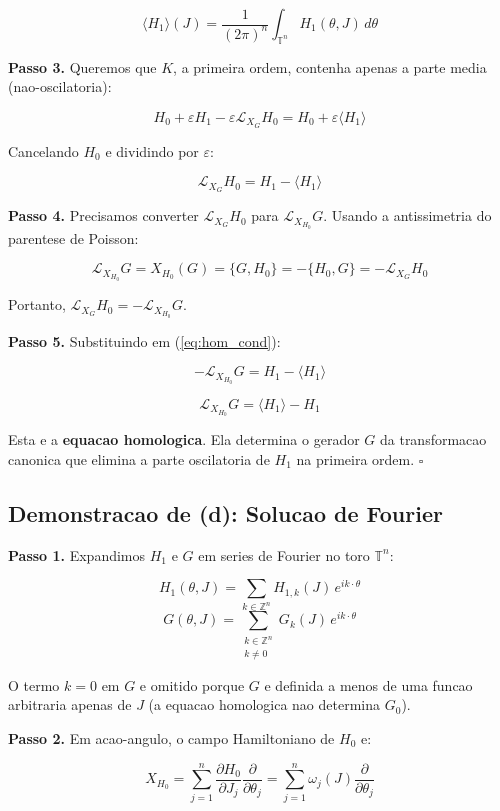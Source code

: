 \documentclass[12pt,a4paper,oneside]{article}
\begin{document}
$$\langle H_1\rangle(J) = \frac{1}{(2\pi)^n}
\int_{\mathbb{T}^n} H_1(\theta, J)\,d\theta$$

\textbf{Passo 3.} Queremos que $K$, a primeira ordem, contenha apenas a
parte media (nao-oscilatoria):

$$H_0 + \varepsilon H_1 - \varepsilon\mathcal{L}_{X_G}H_0 =
H_0 + \varepsilon\langle H_1\rangle$$

Cancelando $H_0$ e dividindo por $\varepsilon$:

\begin{equation}\label{eq:hom_cond}
\mathcal{L}_{X_G}H_0 = H_1 - \langle H_1\rangle
\end{equation}

\textbf{Passo 4.} Precisamos converter $\mathcal{L}_{X_G}H_0$ para
$\mathcal{L}_{X_{H_0}}G$. Usando a antissimetria do parentese de Poisson:

$$\mathcal{L}_{X_{H_0}}G = X_{H_0}(G) = \{G, H_0\} = -\{H_0, G\} =
-\mathcal{L}_{X_G}H_0$$

Portanto, $\mathcal{L}_{X_G}H_0 = -\mathcal{L}_{X_{H_0}}G$.

\textbf{Passo 5.} Substituindo em (\ref{eq:hom_cond}):

$$-\mathcal{L}_{X_{H_0}}G = H_1 - \langle H_1\rangle$$

$$\boxed{\mathcal{L}_{X_{H_0}}G = \langle H_1\rangle - H_1}$$

Esta e a \textbf{equacao homologica}. Ela determina o gerador $G$ da
transformacao canonica que elimina a parte oscilatoria de $H_1$ na
primeira ordem. $\square$

\subsection*{Demonstracao de (d): Solucao de Fourier}

\textbf{Passo 1.} Expandimos $H_1$ e $G$ em series de Fourier no toro
$\mathbb{T}^n$:

$$H_1(\theta, J) = \sum_{k \in \mathbb{Z}^n} H_{1,k}(J) \, e^{i k\cdot\theta}$$
$$G(\theta, J) = \sum_{\substack{k \in \mathbb{Z}^n \\ k \neq 0}}
G_k(J) \, e^{i k\cdot\theta}$$

O termo $k = 0$ em $G$ e omitido porque $G$ e definida a menos de uma
funcao arbitraria apenas de $J$ (a equacao homologica nao determina $G_0$).

\textbf{Passo 2.} Em acao-angulo, o campo Hamiltoniano de $H_0$ e:

$$X_{H_0} = \sum_{j=1}^n \frac{\partial H_0}{\partial J_j}
\frac{\partial}{\partial\theta_j} =
\sum_{j=1}^n \omega_j(J) \frac{\partial}{\partial\theta_j}$$
\end{document}
